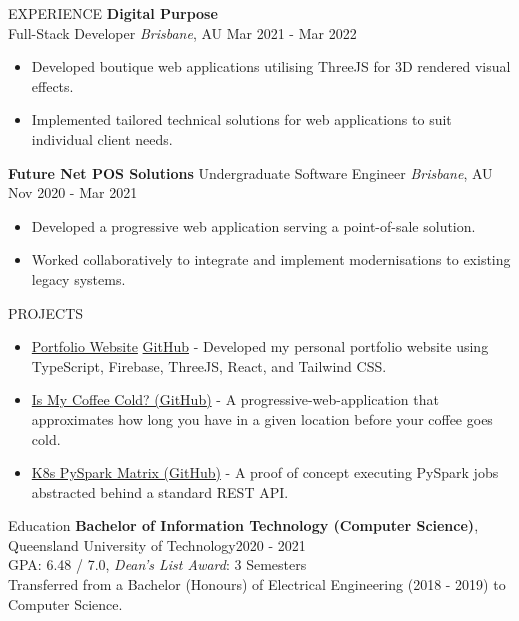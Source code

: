 \documentclass{resume}
\begin{document}
\begin{rSection}{EXPERIENCE}
      \textbf{Digital Purpose}\\
      Full-Stack Developer \hfill \textit{Brisbane}, AU \textbar\space Mar 2021 - Mar 2022
      \begin{itemize}
         \item Developed boutique web applications utilising ThreeJS for 3D rendered visual effects.
         \item Implemented tailored technical solutions for web applications to suit individual client needs.
      \end{itemize}
      
      \textbf{Future Net POS Solutions}
      Undergraduate Software Engineer \hfill \textit{Brisbane}, AU \textbar\space Nov 2020 - Mar 2021
      \begin{itemize}
         \item Developed a progressive web application serving a point-of-sale solution.
         \item Worked collaboratively to integrate and implement modernisations to existing legacy systems.
      \end{itemize}
   \end{rSection} 

   \begin{rSection}{PROJECTS}
      \begin{itemize}
         \item \href{https://jim-t-kelly.web.app/}{Portfolio Website} \textbar\space \href{https://github.com/jamestkelly/personal-portfolio}{GitHub} - Developed my personal portfolio website using TypeScript, Firebase, ThreeJS, React, and Tailwind CSS.
         \item \href{https://github.com/jamestkelly/is-my-coffee-cold}{Is My Coffee Cold? (GitHub)} - A progressive-web-application that approximates how long you have in a given location before your coffee goes cold.
         \item \href{https://github.com/jamestkelly/K8s-PySpark-Matrix}{K8s PySpark Matrix (GitHub)} - A proof of concept executing PySpark jobs abstracted behind a standard REST API.
      \end{itemize}
   \end{rSection} 

   \begin{rSection}{Education}
      {\bf Bachelor of Information Technology (Computer Science)}, Queensland University of Technology\hfill {2020 - 2021}\\
      GPA: 6.48 / 7.0, \textit{Dean's List Award}: 3 Semesters\\
      Transferred from a Bachelor (Honours) of Electrical Engineering (2018 - 2019) to Computer Science.
   \end{rSection}
\end{document}
